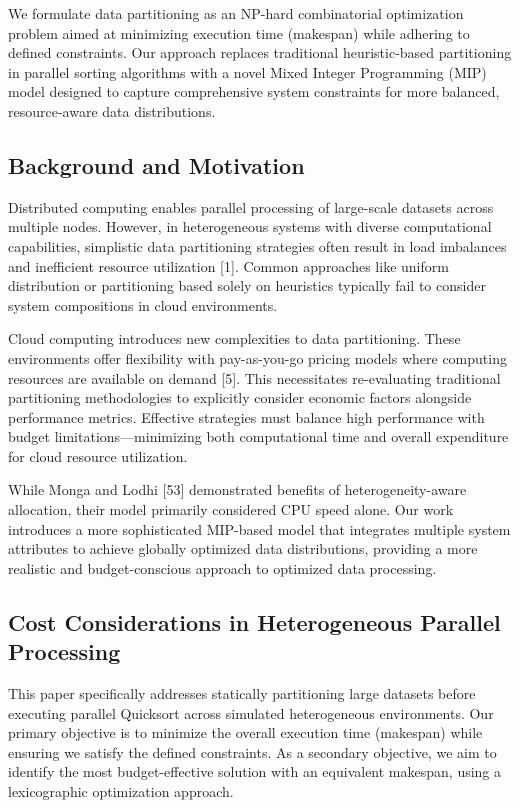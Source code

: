 \documentclass[]{interact}
\theoremstyle{plain}
\theoremstyle{definition}
\theoremstyle{remark}
\begin{document}
We formulate data partitioning as an NP-hard combinatorial optimization problem aimed at minimizing execution time (makespan) while adhering to defined constraints. Our approach replaces traditional heuristic-based partitioning in parallel sorting algorithms with a novel Mixed Integer Programming (MIP) model designed to capture comprehensive system constraints for more balanced, resource-aware data distributions.

\subsection{Background and Motivation}

Distributed computing enables parallel processing of large-scale datasets across multiple nodes. However, in heterogeneous systems with diverse computational capabilities, simplistic data partitioning strategies often result in load imbalances and inefficient resource utilization [1]. Common approaches like uniform distribution or partitioning based solely on heuristics typically fail to consider system compositions in cloud environments.

Cloud computing introduces new complexities to data partitioning. These environments offer flexibility with pay-as-you-go pricing models where computing resources are available on demand [5]. This necessitates re-evaluating traditional partitioning methodologies to explicitly consider economic factors alongside performance metrics. Effective strategies must balance high performance with budget limitations—minimizing both computational time and overall expenditure for cloud resource utilization. 

While Monga and Lodhi [53] demonstrated benefits of heterogeneity-aware allocation, their model primarily considered CPU speed alone. Our work introduces a more sophisticated MIP-based model that integrates multiple system attributes to achieve globally optimized data distributions, providing a more realistic and budget-conscious approach to optimized data processing.


\subsection{Cost Considerations in Heterogeneous Parallel Processing}

This paper specifically addresses statically partitioning large datasets before executing parallel Quicksort across simulated heterogeneous environments. Our primary objective is to minimize the overall execution time (makespan) while ensuring we satisfy the defined constraints. As a secondary objective, we aim to identify the most budget-effective solution with an equivalent makespan, using a lexicographic optimization approach. 
\end{document}
